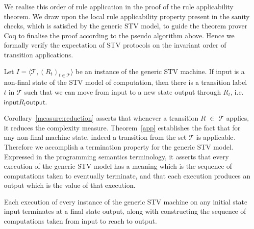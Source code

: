 \documentclass{llncs}
\begin{document}
%
 We realise this order of rule application in the
 proof of the rule  applicability theorem.  We draw upon the local
 rule applicability property present in the sanity checks, which is
 satisfied by the generic STV model, to guide the theorem prover Coq
 to finalise the proof according to the pseudo algorithm above.
 Hence we formally verify the expectation of STV protocols on the
 invariant order of transition applications.
\begin{theorem}\label{app}
Let $I = \langle \mathcal{T}, (R_t)_{t \in \mathcal{T}} \rangle$ be
an instance of the generic STV machine.  If \textsf{input} is a
non-final state of the STV model of computation, then there is a 
transition label  $t$ in $\mathcal{T}$ such that we can
move from \textsf{input} to a new state \textsf{output} through
$R_t$, i.e. $\mathsf{input}\mathrel{R_t}\mathsf{output}$.
\end{theorem}
Corollary~\ref{measure:reduction} asserts that whenever a transition $R$ $\in$ $\mathcal{T}$ applies, it reduces the complexity measure. Theorem~\ref{app} establishes the fact that for any non-final machine state, indeed a transition from the set $\mathcal{T}$ is applicable. Therefore we accomplish a termination property for the generic STV model. Expressed in the programming semantics terminology, it asserts that every execution of the generic STV model has a meaning which is the sequence of computations taken to eventually terminate, and that each execution produces an output which is the value of that execution. 
\begin{theorem}[Termination]\label{termination}
Each execution of every instance of the generic STV machine on any
initial state
\textsf{input} terminates at a final state \textsf{output},
along with constructing the sequence of computations taken from
\textsf{input} to reach to \textsf{output}.  \end{theorem}   
\end{document}
